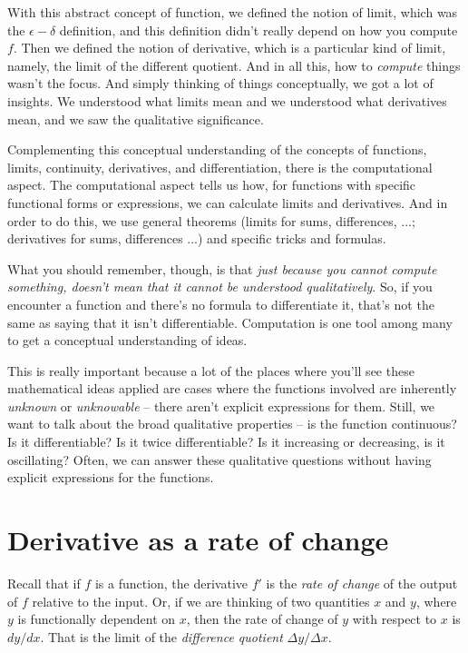 \documentclass[10pt]{amsart}
\begin{document}
With this abstract concept of function, we defined the notion of
limit, which was the $\epsilon-\delta$ definition, and this definition
didn't really depend on how you compute $f$. Then we defined the
notion of derivative, which is a particular kind of limit, namely, the
limit of the different quotient. And in all this, how to {\em compute}
things wasn't the focus. And simply thinking of things conceptually,
we got a lot of insights. We understood what limits mean and we
understood what derivatives mean, and we saw the qualitative
significance.

Complementing this conceptual understanding of the concepts of
functions, limits, continuity, derivatives, and differentiation, there
is the computational aspect. The computational aspect tells us how,
for functions with specific functional forms or expressions, we can
calculate limits and derivatives. And in order to do this, we use
general theorems (limits for sums, differences, ...; derivatives for
sums, differences ...) and specific tricks and formulas.

What you should remember, though, is that {\em just because you cannot
compute something, doesn't mean that it cannot be understood
qualitatively}. So, if you encounter a function and there's no formula
to differentiate it, that's not the same as saying that it isn't
differentiable. Computation is one tool among many to get a conceptual
understanding of ideas.

This is really important because a lot of the places where you'll see
these mathematical ideas applied are cases where the functions
involved are inherently {\em unknown} or {\em unknowable} -- there
aren't explicit expressions for them. Still, we want to talk about the
broad qualitative properties -- is the function continuous? Is it
differentiable? Is it twice differentiable? Is it increasing or
decreasing, is it oscillating? Often, we can answer these qualitative
questions without having explicit expressions for the functions.

\section{Derivative as a rate of change}

Recall that if $f$ is a function, the derivative $f'$ is the {\em rate
of change} of the output of $f$ relative to the input. Or, if we are
thinking of two quantities $x$ and $y$, where $y$ is functionally
dependent on $x$, then the rate of change of $y$ with respect to $x$
is $dy/dx$. That is the limit of the {\em difference quotient} $\Delta
y/\Delta x$.
\end{document}
